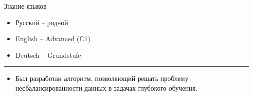 \documentclass[a4paper,10pt]{article}
\newlength{\cvcolumngapwidth}
\newlength{\cvleftcolumnwidth}
\newlength{\cvrightcolumnwidth}
\newcommand{\cvsectionstyle}[1]{{\normalsize\cvsectionfont\textcolor{cvsectioncolor}{#1}}}
\newcommand{\cvheadingstyle}[1]{{\normalsize\cvheadingfont\textcolor{cvheadingcolor}{#1}}}
\newlength{\cvafteritemskipamount}
\newlength{\cvaftersectionskipamount}
\newlength{\cvbetweensectionandheadingextraskipamount}
\newlength{\cvparskip}
\newcommand{\cvsection}[1]{
    \begin{minipage}[t]{\cvleftcolumnwidth}
        \raggedleft\cvsectionstyle{#1}
    \end{minipage}%
    \hspace{\cvcolumngapwidth}%
    \begin{minipage}[t]{\cvrightcolumnwidth}
        \textcolor{cvrulecolor}{\rule{\cvrightcolumnwidth}{0.3mm}}
    \end{minipage}

    \vspace{\cvaftersectionskipamount}
}
\newcommand{\cvitem}[2]{
    \begin{minipage}[t]{\cvleftcolumnwidth}
        \raggedleft #1
    \end{minipage}%
    \hspace{\cvcolumngapwidth}%
    \begin{minipage}[t]{\cvrightcolumnwidth}
        \setlength{\parskip}{\cvparskip} #2
    \end{minipage}

    \vspace{\cvafteritemskipamount}
}
\begin{document}
\cvitem{
    \cvheadingstyle{Знание языков}
}{
    
    \begin{itemize}
        \item Русский -- родной
        \item English -- Advanced (C1)
        \item Deutsch -- Grundstufe
    \end{itemize}


}


\cvsection{Достижения}

\vspace{\cvbetweensectionandheadingextraskipamount}

\cvitem{
    \cvheadingstyle{}
}{
    \begin{itemize}
        \item Был разработан алгоритм, позволяющий решать проблему\\ несбалансированности данных в задачах глубокого обучения.
    \end{itemize}
}
\end{document}
